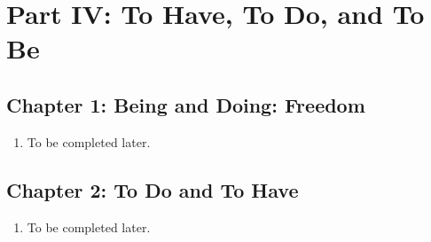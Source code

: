 \section{Part IV: To Have, To Do, and To Be}

\subsection{Chapter 1: Being and Doing: Freedom}

\begin{enumerate}
  \item To be completed later.
\end{enumerate}

\subsection{Chapter 2: To Do and To Have}

\begin{enumerate}
  \item To be completed later.
\end{enumerate}
